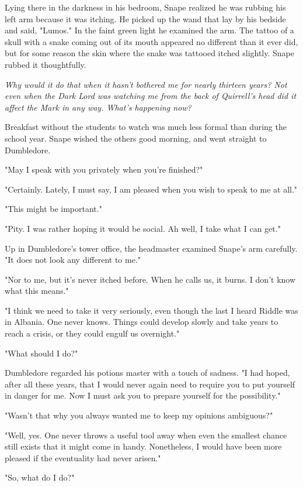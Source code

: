 Lying there in the darkness in his bedroom, Snape realized he was rubbing his left arm because it was itching. He picked up the wand that lay by his bedside and said, "Lumos." In the faint green light he examined the arm. The tattoo of a skull with a snake coming out of its mouth appeared no different than it ever did, but for some reason the skin where the snake was tattooed itched slightly. Snape rubbed it thoughtfully.

\emph{Why would it do that when it hasn't bothered me for nearly thirteen years? Not even when the Dark Lord was watching me from the back of Quirrell's head did it affect the Mark in any way. What's happening now?}

Breakfast without the students to watch was much less formal than during the school year. Snape wished the others good morning, and went straight to Dumbledore.

"May I speak with you privately when you're finished?"

"Certainly. Lately, I must say, I am pleased when you wish to speak to me at all."

"This might be important."

"Pity. I was rather hoping it would be social. Ah well, I take what I can get."

Up in Dumbledore's tower office, the headmaster examined Snape's arm carefully. "It does not look any different to me."

"Nor to me, but it's never itched before. When he calls us, it burns. I don't know what this means."

"I think we need to take it very seriously, even though the last I heard Riddle was in Albania. One never knows. Things could develop slowly and take years to reach a crisis, or they could engulf us overnight."

"What should I do?"

Dumbledore regarded his potions master with a touch of sadness. "I had hoped, after all these years, that I would never again need to require you to put yourself in danger for me. Now I must ask you to prepare yourself for the possibility."

"Wasn't that why you always wanted me to keep my opinions{\el} ambiguous?"

"Well, yes. One never throws a useful tool away when even the smallest chance still exists that it might come in handy. Nonetheless, I would have been more pleased if the eventuality had never arisen."

"So, what do I do?"

